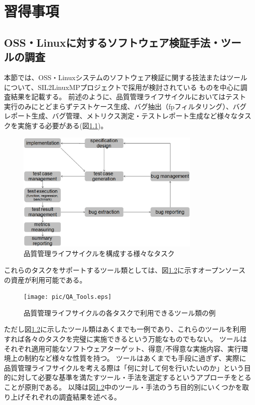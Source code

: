 \chapter{習得事項}
\section{OSS・Linuxに対するソフトウェア検証手法・ツールの調査}
\label{tool}
本節では、OSS・Linuxシステムのソフトウェア検証に関する技法またはツールについて、SIL2LinuxMPプロジェクトで採用が検討されている%
ものを中心に調査結果を記載する。
前述のように、品質管理ライフサイクルにおいてはテスト実行のみにとどまらずテストケース生成、バグ抽出（\acrshort{fp}フィルタリング）、バグレポート生成、バグ管理、メトリクス測定・テストレポート生成など様々なタスクを実施する必要がある(図\ref{QA_Tasks})。
\begin{figure}[ht]
  \centering
  \includegraphics[width=0.8\textwidth]{pic/QA_Tasks.eps}
  \caption{品質管理ライフサイクルを構成する様々なタスク}
  \label{QA_Tasks}
\end{figure}
\par
これらのタスクをサポートするツール類としては、図\ref{QA_Tools}に示すオープンソースの資産が利用可能である。
\begin{figure}[ht]
  \centering
  \texttt{[image: pic/QA\_Tools.eps]}
  \caption{品質管理ライフサイクルの各タスクで利用できるツール類の例}
  \label{QA_Tools}
\end{figure}
ただし図\ref{QA_Tools}に示したツール類はあくまでも一例であり、これらのツールを利用すれば各々のタスクを完璧に実施できるという万能なものでもない。
ツールはそれぞれ適用可能なソフトウェアターゲット、得意/不得意な実施内容、実行環境上の制約など様々な性質を持つ。
ツールはあくまでも手段に過ぎず、実際に品質管理ライフサイクルを考える際は「何に対して何を行いたいのか」という目的に対して必要な基準を満たすツール・手法を選定するというアプローチをとることが原則である。
以降は図\ref{QA_Tools}中のツール・手法のうち目的別にいくつかを取り上げそれぞれの調査結果を述べる。

